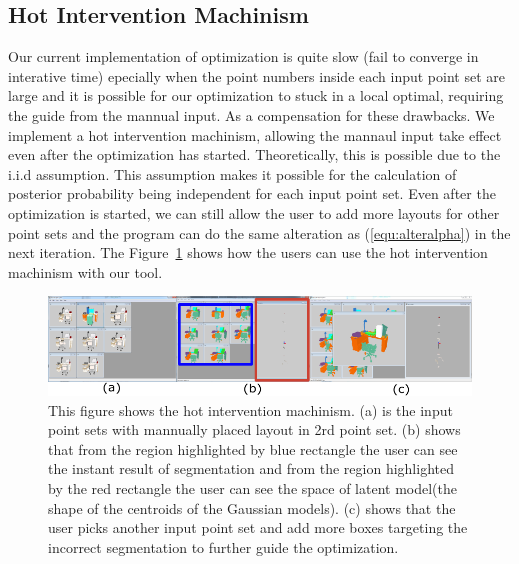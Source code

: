 \subsection{Hot Intervention Machinism}
Our current implementation of optimization is quite slow (fail to converge in interative time) epecially when the point numbers inside each input point set are large and it is possible for our optimization to stuck in a local optimal, requiring the guide from the mannual input. As a compensation for these drawbacks. We implement a hot intervention machinism, allowing the mannaul input take effect even after the optimization has started. Theoretically, this is possible due to the i.i.d assumption. 
This assumption makes it possible for the calculation of posterior probability being independent for each input point set. Even after the optimization is started, we can still allow the user to add more layouts for other point sets and the program can do the same alteration as (\ref{equ:alteralpha}) in the next iteration. The Figure~\ref{fig:hi} shows how the users can use the hot intervention machinism with our tool.
\begin{figure}[htb]
	\centering
	\includegraphics[width=\linewidth]{images/hotintervention/hi}
	\caption{\label{fig:hi}This figure shows the hot intervention machinism. (a) is the input point sets with mannually placed layout in 2rd point set. (b) shows that from the region highlighted by blue rectangle the user can see the instant result of segmentation and from the region highlighted by the red rectangle the user can see the space of latent model(the shape of the centroids of the Gaussian models). (c) shows that the user picks another input point set and add more boxes targeting the incorrect segmentation to further guide the optimization.}
\end{figure}
 